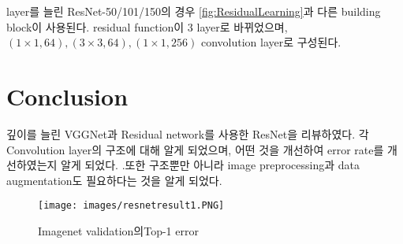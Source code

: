 \documentclass[extendedabs]{bmvc2k}
\begin{document}
layer를 늘린 ResNet-50/101/150의 경우 \ref{fig:ResidualLearning}과 다른 building block이 사용된다. residual function이 3 layer로 바뀌었으며, $(1\times1,64),(3\times3,64),(1\times1,256)$ convolution layer로 구성된다.
\section{Conclusion}
깊이를 늘린 VGGNet\cite{simonyan2015deepconvolutionalnetworkslargescale}과 Residual network를 사용한 ResNet\cite{resnet}을 리뷰하였다. 각 Convolution layer의 구조에 대해 알게 되었으며, 어떤 것을 개선하여 error rate를 개선하였는지 알게 되었다. .또한 구조뿐만 아니라 image preprocessing과 data augmentation도 필요하다는 것을 알게 되었다.

\begin{figure}[t]
	\texttt{[image: images/resnetresult1.PNG]}
	\caption{Imagenet validation의Top-1 error}
 \label{fig:plainresnetresult}
	\vspace{-2mm}
\end{figure}

\newpage

\end{document}
